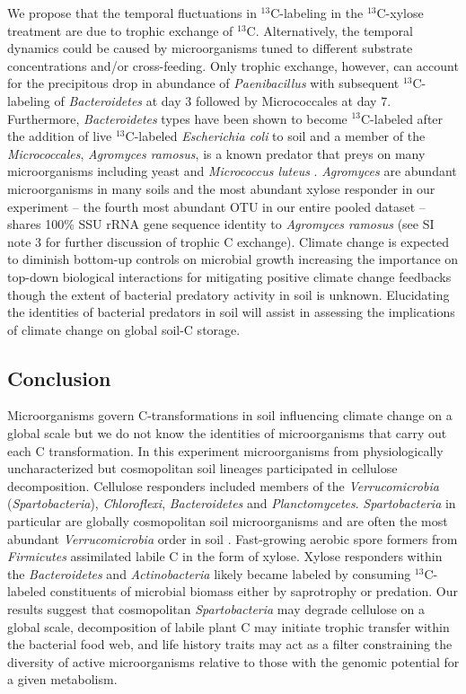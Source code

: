 We propose that the temporal fluctuations in $^{13}$C-labeling in the
$^{13}$C-xylose treatment are due to trophic exchange of $^{13}$C.
Alternatively, the temporal dynamics could be caused by microorganisms tuned to
different substrate concentrations and/or cross-feeding. Only trophic exchange,
however, can account for the precipitous drop in abundance of
\textit{Paenibacillus} with subsequent $^{13}$C-labeling of
\textit{Bacteroidetes} at day 3 followed by Micrococcales at day 7.
Furthermore, \textit{Bacteroidetes} types have been shown to become
$^{13}$C-labeled after the addition of live $^{13}$C-labeled
\textit{Escherichia coli} to soil \citep{Lueders2006} and a member of the
\textit{Micrococcales}, \textit{Agromyces ramosus}, is a known predator that
preys on many microorganisms including yeast and \textit{Micrococcus luteus}
\citep{16346402}. \textit{Agromyces} are abundant microorganisms in many soils
and the most abundant xylose responder in our experiment -- the fourth most
abundant OTU in our entire pooled dataset -- shares 100\% SSU rRNA gene
sequence identity to \textit{Agromyces ramosus} (see SI note 3 for further
discussion of trophic C exchange). Climate change is expected to diminish
bottom-up controls on microbial growth increasing the importance on top-down
biological interactions for mitigating positive climate change feedbacks
\citep{Crowther2015} though the extent of bacterial predatory activity in soil
is unknown. Elucidating the identities of bacterial predators in soil will
assist in assessing the implications of climate change on global soil-C
storage.

\subsection{Conclusion} 
Microorganisms govern C-transformations in soil influencing climate change on
a global scale but we do not know the identities of microorganisms that carry
out each C transformation. In this experiment microorganisms from physiologically
uncharacterized but cosmopolitan soil lineages participated in cellulose
decomposition. Cellulose responders included members of the
\textit{Verrucomicrobia} (\textit{Spartobacteria}), \textit{Chloroflexi},
\textit{Bacteroidetes} and \textit{Planctomycetes}. \textit{Spartobacteria} in
particular are globally cosmopolitan soil microorganisms and are often the most
abundant \textit{Verrucomicrobia} order in soil \citep{Bergmann_2011}.
Fast-growing aerobic spore formers from \textit{Firmicutes} assimilated labile
C in the form of xylose. Xylose responders within the \textit{Bacteroidetes}
and \textit{Actinobacteria} likely became labeled by consuming $^{13}$C-labeled
constituents of microbial biomass either by saprotrophy or predation. Our
results suggest that cosmopolitan \textit{Spartobacteria} may degrade cellulose
on a global scale, decomposition of labile plant C may initiate trophic transfer 
within the bacterial food web, and life history traits may act
as a filter constraining the diversity of active microorganisms relative to
those with the genomic potential for a given metabolism.
